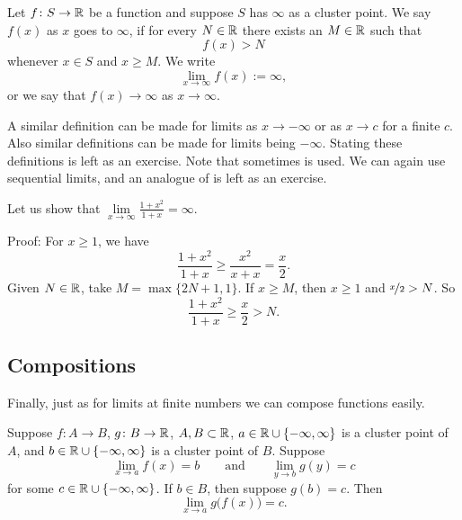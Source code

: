 \begin{defn}
%
Let $f \colon S \to {\mathbb{R}}$ be a function and suppose 
$S$ has $\infty$ as a cluster point.
We say $f(x)$
\emph{} 
as $x$ goes to $\infty$,
if for every $N \in {\mathbb{R}}$
there exists an $M \in {\mathbb{R}}$ such that
\begin{equation*}
f(x) > N
\end{equation*}
whenever $x \in S$ and $x \geq M$.
We write
\begin{equation*}
\lim_{x \to \infty} f(x) := \infty ,
\end{equation*}
or we say that $f(x) \to \infty$ as $x \to \infty$.
\end{defn}

A similar definition can be made for limits as $x \to -\infty$
or as $x \to c$ for a finite $c$.  Also similar definitions can be
made for limits being $-\infty$.  Stating these definitions is left
as an exercise.
Note that
sometimes \emph{} is used.
We can again use sequential limits, and an analogue of 
 is left as an exercise.

\begin{example}
Let us show that $\lim\limits_{x \to \infty} \frac{1+x^2}{1+x} = \infty$.

Proof: For $x \geq 1$, we have
\begin{equation*}
\frac{1+x^2}{1+x} \geq 
\frac{x^2}{x+x}  = 
\frac{x}{2} .
\end{equation*}
Given $N \in {\mathbb{R}}$, take $M = \max \{ 2N+1 , 1 \}$.
If $x \geq M$, then $x \geq 1$ and $\nicefrac{x}{2} > N$.
So
\begin{equation*}
\frac{1+x^2}{1+x} \geq 
\frac{x}{2} > N .
\end{equation*}
\end{example}

\subsection{Compositions}

Finally, just as for limits at finite numbers we can compose functions
easily.

\begin{prop} \label{prop:inflimcompositions}
Suppose $f \colon A \to B$, $g \colon B \to {\mathbb{R}}$, $A, B \subset {\mathbb{R}}$, 
$a \in {\mathbb{R}} \cup \{ -\infty, \infty\}$ is a cluster point of $A$,
and $b \in {\mathbb{R}} \cup \{ -\infty, \infty\}$ is a cluster point of $B$.
Suppose 
\begin{equation*}
\lim_{x \to a} f(x) = b\qquad \text{and} \qquad \lim_{y \to b} g(y) = c
\end{equation*}
for some $c \in {\mathbb{R}} \cup \{ -\infty, \infty \}$.
If $b \in B$, then suppose $g(b) = c$.
Then
\begin{equation*}
\lim_{x \to a} g\bigl(f(x)\bigr) = c .
\end{equation*}
\end{prop}

